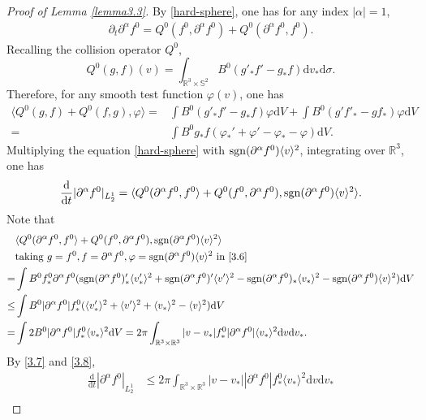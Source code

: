 \documentclass[reqno,10pt]{amsart}
\let\pa=\partial
\let\al=\alpha
\let\vf=\varphi
\def\pa{\partial}
\newcommand{\beq}{\begin{equation}}
\newcommand{\eeq}{\end{equation}}
\newcommand{\beno}{\begin{eqnarray*}}
\newcommand{\eeno}{\end{eqnarray*}}
\theoremstyle{definition}
\numberwithin{equation}{section}
\begin{document}
\begin{proof}[Proof of Lemma \ref{lemma3.3}]
    By \eqref{hard-sphere}, one has for any index $|\al|=1$,
    \beno
\pa_{t}\pa^{\al}f^0=Q^0(f^0,\pa^{\al}f^0)+Q^0(\pa^{\al}f^0,f^0).
    \eeno
    Recalling the  collision operator $Q^0$, 
    $$Q^0(g,f)(v)=\int_{\mathbb{R}^3\times \mathbb{S}^2}B^0(g'_*f'-g_*f)\mathrm{d}v_*\mathrm{d}\sigma.$$
    Therefore, for any smooth test function $\vf(v)$, one has
    \beq\label{3.6}
\begin{aligned}
    \langle Q^0(g,f)+Q^0(f,g),\vf\rangle=&\int B^0(g'_*f'-g_*f)\vf\mathrm{d}V+\int B^0(g'f'_*-gf_*)\vf\mathrm{d}V\\
    = & \int B^0 g_*f(\vf_*'+\vf'-\vf_*-\vf)\mathrm{d}V.
\end{aligned}
    \eeq
    Multiplying the equation \eqref{hard-sphere} with $\textup{\textup{sgn}}(\pa^{\al}f^0)\langle v\rangle^2$, integrating over $\mathbb{R}^3$, one has
    \beq\label{3.7}
    \begin{aligned}
        \frac{\mathrm{d}}{\mathrm{d}t}|\pa^{\al}f^0|_{L^1_2}=\langle Q^0(\pa^{\al}f^{0},f^0\rangle+Q^0(f^0,\pa^{\al}f^{0}),\textup{\textup{sgn}}(\pa^{\al}f^0)\langle v\rangle^2\rangle.
    \end{aligned}
    \eeq
    Note that
    \beq\label{3.8}
    \begin{aligned}
    &\langle Q^0(\pa^{\al}f^{0},f^0\rangle+Q^0(f^0,\pa^{\al}f^{0}),\textup{\textup{sgn}}(\pa^{\al}f^0)\langle v\rangle^2\rangle\\
    &\text{taking $g= f^0,f=\pa^\al f^0,\vf=\textup{\textup{sgn}}(\pa^\al f^0)\langle v\rangle^2$ in \eqref{3.6}}\\
    =&\int B^0f^0_*\pa^\al f^0(\textup{\textup{sgn}}(\pa^\al f^0)'_*\langle v'_*\rangle^2+\textup{sgn}(\pa^\al f^0)'\langle v'\rangle^2-\textup{sgn}(\pa^\al f^0)_*\langle v_*\rangle^2-\textup{sgn}(\pa^\al f^0)\langle v\rangle^2)\mathrm{d}V\\
    \le& \int B^0|\pa^\al f^0|f^0_*(\langle v'_*\rangle^2+\langle v'\rangle^2+\langle v_*\rangle^2-\langle v\rangle^2)\mathrm{d}V\\
    =& \int 2B^0|\pa^{\al}f^{0}|f^0_*\langle v_*\rangle^2\mathrm{d}V=2\pi\int_{\mathbb{R}^3\times\mathbb{R}^3}|v-v_*|f^0_*|\pa^{\al}f^0|\langle v_*\rangle^2\mathrm{d}v\mathrm{d}v_*.
    \end{aligned}
    \eeq
    By \eqref{3.7} and \eqref{3.8},
    \begin{equation}\label{3.9}
    \begin{aligned}
    \frac{\mathrm{d}}{\mathrm{d}t}|\pa^{\al}f^0|_{L^1_2}&\le 2\pi \int_{\mathbb{R}^3\times\mathbb{R}^3}|v-v_*||\pa^{\al}f^{0}|f^0_*\langle v_*\rangle^2\mathrm{d}v\mathrm{d}v_*\\

\end{aligned}
\end{equation}
\end{proof}
\end{document}

